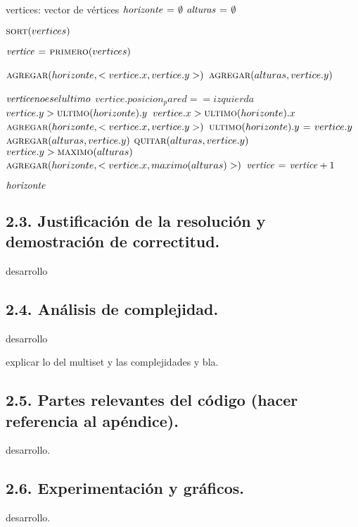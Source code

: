 \begin{codebox}
\li \Comment vertices: vector de vértices
\li $\id{horizonte} \gets \emptyset$
\li $\id{alturas} \gets \emptyset$

\li $\textnormal{\scshape sort}(vertices)$

\li $\id{vertice} \gets \proc{primero}(vertices)$


\li $\textnormal{\scshape agregar}(horizonte, <vertice.x, vertice.y>)$
\li $\textnormal{\scshape agregar}(alturas, vertice.y)$


\li \While $\id{vertice} no es el ultimo$
      \Do
\li     \If $vertice.posicion_pared == izquierda$
          \Then
\li         \If $vertice.y > \textnormal{\scshape ultimo}(horizonte).y$
              \Then
\li             \If $vertice.x > \textnormal{\scshape ultimo}(horizonte).x$
                  \Then
\li                 $\textnormal{\scshape agregar}(horizonte, <vertice.x, vertice.y>)$
\li               \Else
\li                 $\textnormal{\scshape ultimo}(horizonte).y \mathrel{\hspace{1pt}=\hspace{1pt}} vertice.y$
                 \End
              \End
\li         $\textnormal{\scshape agregar}(alturas, vertice.y)$
\li       \Else
\li         $\textnormal{\scshape quitar}(alturas, vertice.y)$
\li         \If $vertice.y > \textnormal{\scshape maximo}(alturas)$
              \Then
\li             $\textnormal{\scshape agregar}(horizonte, <vertice.x, maximo(alturas)>)$
              \End
          \End
\li     $\id{vertice} \gets \id{vertice} + 1$
      \End

\li \Return $\id{horizonte}$
\end{codebox}





\subsection{2.3. Justificación de la resolución y demostración de correctitud.}

\vspace*{0.3cm}

desarrollo





\subsection{2.4. Análisis de complejidad.}

\vspace*{0.3cm}



desarrollo


explicar lo del multiset y las complejidades y bla.





\subsection{2.5. Partes relevantes del código (hacer referencia al apéndice).}

\vspace*{0.3cm}

desarrollo.





\subsection{2.6. Experimentación y gráficos.}

\vspace*{0.3cm}

desarrollo.
